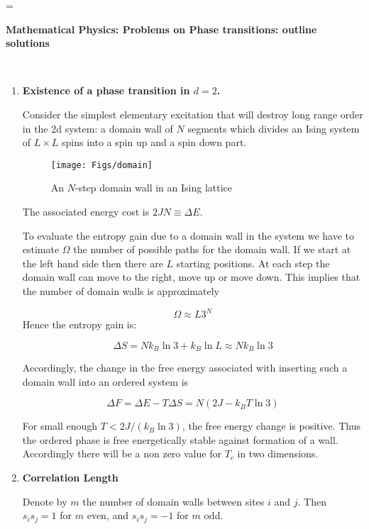 \documentclass[a4paper,12pt,twoside]{article}
\begin{document}
\pagestyle{empty}
%
\def\deg{^\circ}
\def\h{\hfil\break}
\def\hh{\h\h}
\def\singlespace{\baselineskip=\normalbaselineskip}
\singlespace\noindent
\centerline{\bf Mathematical Physics: Problems on Phase transitions: outline solutions}\\


\begin{enumerate}

\item {\bf Existence of a phase transition in $d=2$.}

Consider the simplest elementary excitation that will destroy long range
order in the 2d system: a domain wall of $N$ segments which divides an Ising system of $L\times L$ spins into a spin up and a spin down part. 

\begin{figure}[h]
\centerline{\texttt{[image: Figs/domain]}}
\caption{An $N$-step domain wall in an Ising lattice}
\end{figure}

The associated energy cost is $2JN \equiv \Delta E$. 

To evaluate the entropy gain due to a domain wall in the system we have to estimate $\Omega$ the number of possible paths for the domain wall.
If we start at the left hand side then there are $L$ starting positions.
At each step the domain wall can move to the right, move up or move down. This implies that the number of domain walls is approximately

$$
\Omega\approx L3^N
$$
Hence the entropy gain is:

$$
\Delta S=Nk_B\ln 3+k_B\ln L\approx Nk_B\ln 3  
$$

Accordingly, the change in the free energy associated with inserting such a domain wall into an ordered system is

\[
\Delta F=\Delta E-T\Delta S= N(2J-k_BT\ln 3)
\]

For small enough $T <2J/(k_B\ln 3)$, the free energy change is positive.
Thus the ordered phase is free energetically stable against formation of a
wall. Accordingly there will be a non zero value for $T_c$ in two dimensions.

\item {\bf Correlation Length}

Denote by $m$ the number of domain walls between sites $i$ and $j$. Then
$s_is_j=1$ for $m$ even, and $s_is_j=-1$ for $m$
odd.


\end{enumerate}
\end{document}
